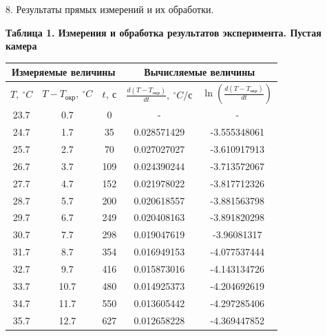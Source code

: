 \documentclass[12pt]{article}
\begin{document}
\begin{flushleft}
    8. Результаты прямых измерений и их обработки. \\

    \newpage

    \begin{center}
        \textbf{Таблица 1. Измерения и обработка результатов эксперимента. Пустая камера} \\
    \end{center}
    \begin{table}[h!]
        \centering
        \begin{tabular}{|c|c|c|c|c|}
            \hline
            \multicolumn{3}{|c|}{Измеряемые величины} & \multicolumn{2}{c|}{Вычисляемые величины} \\
            \hline
            $T,\ ^\circ C$ & $T - T_{\text{окр}},\ ^\circ C$ & $t,\ \text{с}$ & $\frac{d(T - T_{\text{окр}})}{dt},\ ^\circ C/\text{с}$ & $\ln\left(\frac{d(T - T_{\text{окр}})}{dt}\right)$ \\
            \hline
            23.7	&	0.7	&	0	&	-	&	 -	\\
            \hline
            24.7	&	1.7	&	35	&	0.028571429	&	-3.555348061	\\
            \hline
            25.7	&	2.7	&	70	&	0.027027027	&	-3.610917913	\\
            \hline
            26.7	&	3.7	&	109	&	0.024390244	&	-3.713572067	\\
            \hline
            27.7	&	4.7	&	152	&	0.021978022	&	-3.817712326	\\
            \hline
            28.7	&	5.7	&	200	&	0.020618557	&	-3.881563798	\\
            \hline
            29.7	&	6.7	&	249	&	0.020408163	&	-3.891820298	\\
            \hline
            30.7	&	7.7	&	298	&	0.019047619	&	-3.96081317	\\
            \hline
            31.7	&	8.7	&	354	&	0.016949153	&	-4.077537444	\\
            \hline
            32.7	&	9.7	&	416	&	0.015873016	&	-4.143134726	\\
            \hline
            33.7	&	10.7	&	480	&	0.014925373	&	-4.204692619	\\
            \hline
            34.7	&	11.7	&	550	&	0.013605442	&	-4.297285406	\\
            \hline
            35.7	&	12.7	&	627	&	0.012658228	&	-4.369447852	\\

\end{tabular}
\end{table}
\end{flushleft}
\end{document}
